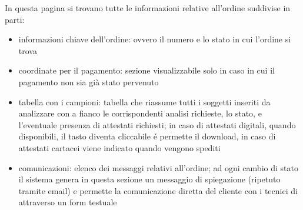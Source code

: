 In questa pagina si trovano tutte le informazioni relative all'ordine suddivise in parti:
\begin{itemize}
 \item informazioni chiave dell'ordine: ovvero il numero e lo stato in cui l'ordine si trova
 \item coordinate per il pagamento: sezione visualizzabile solo in caso in cui il pagamento non sia già stato pervenuto
 \item tabella con i campioni: tabella che riassume tutti i soggetti inseriti da analizzare con a fianco le corrispondenti analisi richieste, lo stato, e l'eventuale presenza di attestati richiesti; in caso di attestati digitali, quando disponibili, il tasto diventa cliccabile é permette il download, in caso di attestati cartacei viene indicato quando vengono spediti
 \item comunicazioni: elenco dei messaggi relativi all'ordine; ad ogni cambio di stato il sistema genera in questa sezione un messaggio di spiegazione (ripetuto tramite email) e permette la comunicazione diretta del cliente con i tecnici di {\fem} attraverso un form testuale
\end{itemize}